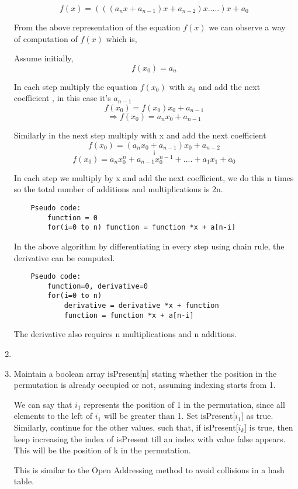 \documentclass[12pt]{article}
\begin{document}
\begin{enumerate}
    \begin{equation} 
    f(x) = (((a_nx + a_{n-1})x + a_{n-2})x.....)x + a_0
    \end{equation}
    
    From the above representation of the equation $f(x)$ we can observe a way of computation of $f(x)$ which is,
    
    Assume initially, \[ f(x_0) = a_n \] 
    
    In each step multiply the equation $f(x_0)$ with $x_0$ and add the next coefficient , in this case it's $a_{n-1}$  \[ f(x_0) = f(x_0)x_0 + a_{n-1}\]
    \[ \Rightarrow{f(x_0) = a_nx_0 + a_{n-1}}\]
    
    Similarly in the next step multiply  with x and add the next coefficient
    \[ f(x_0) = (a_nx_0 + a_{n-1})x_0 + a_{n-2}\]
    \[.\]
    \[.\]
    \[.\]
    \[.\]
    \[f(x_0) = a_nx_0^n + a_{n-1}x_0^{n-1} + .... + a_1x_1 + a_0\]
    
    In each step we multiply by x and add the next coefficient, we do this n times so the total number of additions and multiplications is 2n.
    \begin{verbatim}
    Pseudo code:
        function = 0
        for(i=0 to n) function = function *x + a[n-i]
    \end{verbatim}
    
    In the above algorithm by differentiating in every step using chain rule, the derivative can be computed.
    \begin{verbatim}
    Pseudo code:
        function=0, derivative=0
        for(i=0 to n) 
            derivative = derivative *x + function
            function = function *x + a[n-i]
    \end{verbatim}
    The derivative also requires n multiplications and n additions.  
    \item 
    \item Maintain a boolean array isPresent[n] stating whether the position in the permutation is already occupied or not, assuming indexing starts from 1.
    
    We can say that $i_1$ represents the position of 1 in the permutation, since all elements to the left of $i_1$ will be greater than 1. Set isPresent[$i_1$] as true.
    Similarly, continue for the other values, such that, if isPresent[$i_k$] is true, then keep increasing the index of isPresent till an index with value false appears. This will be the position of k in the permutation.
    
    This is similar to the Open Addressing method to avoid collisions in a hash table.
    

\end{enumerate}
\end{document}
